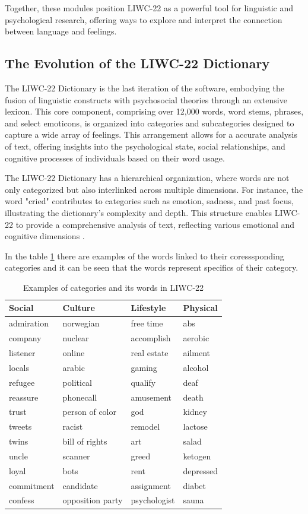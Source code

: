 Together, these modules position LIWC-22 as a powerful tool for linguistic and psychological research, offering ways to explore and interpret the connection between language and feelings.

\subsection{The Evolution of the LIWC-22 Dictionary}

\quad The LIWC-22 Dictionary is the last iteration of the software, embodying the fusion of linguistic constructs with psychosocial theories through an extensive lexicon. This core component, comprising over 12,000 words, word stems, phrases, and select emoticons, is organized into categories and subcategories designed to capture a wide array of feelings. This arrangement allows for a accurate analysis of text, offering insights into the psychological state, social relationships, and cognitive processes of individuals based on their word usage.

The LIWC-22 Dictionary has a hierarchical organization, where words are not only categorized but also interlinked across multiple dimensions. For instance, the word "cried" contributes to categories such as emotion, sadness, and past focus, illustrating the dictionary's complexity and depth. This structure enables LIWC-22 to provide a comprehensive analysis of text, reflecting various emotional and cognitive dimensions \cite{boyd2022development}.

In the table \ref{examplesLIWC22Dic} there are examples of the words linked to their coresssponding categories and it can be seen that the words represent specifics of their category. 

\begin{table}[ht]
\centering
\begin{tabular}{llll}
\hline
\textbf{Social} & \textbf{Culture} & \textbf{Lifestyle} & \textbf{Physical} \\ \hline
admiration & norwegian & free time & abs \\
company & nuclear & accomplish & aerobic\\
listener & online & real estate & ailment\\
locals & arabic & gaming & alcohol\\
refugee & political & qualify & deaf\\
reassure & phonecall & amusement &  death\\
trust & person of color & god &  kidney\\
tweets & racist &  remodel &  lactose\\
twins & bill of rights & art & salad\\
uncle & scanner & greed & ketogen\\
loyal & bots & rent &  depressed\\
commitment & candidate & assignment &  diabet\\
confess & opposition party & psychologist & sauna\\ \hline
\end{tabular}
\caption{Examples of categories and its words in LIWC-22}
\label{examplesLIWC22Dic}
\end{table}


